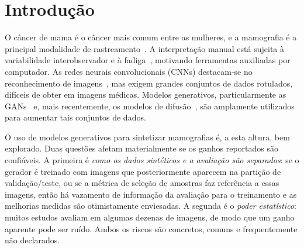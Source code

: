 \documentclass[runningheads]{llncs}
\begin{document}
\section{Introdução}
O câncer de mama é o câncer mais comum entre as mulheres, e a mamografia é a
principal modalidade de rastreamento~\cite{precoce2004controle,azevedo2016importancia}.
A interpretação manual está sujeita à variabilidade interobservador e à
fadiga~\cite{obuchowicz2020interobserver}, motivando ferramentas auxiliadas por
computador. As redes neurais convolucionais (CNNs) destacam-se no reconhecimento
de imagens~\cite{lecun2015deep,mendel2019transfer}, mas exigem grandes conjuntos
de dados rotulados, difíceis de obter em imagens médicas. Modelos generativos,
particularmente as GANs~\cite{goodfellow2014gan} e, mais recentemente, os modelos
de difusão~\cite{rombach2022ldm}, são amplamente utilizados para aumentar tais
conjuntos de dados.

O uso de modelos generativos para sintetizar mamografias é, a esta altura, bem
explorado. Duas questões afetam materialmente se os ganhos reportados são
confiáveis. A primeira é \emph{como os dados sintéticos e a avaliação são
separados}: se o gerador é treinado com imagens que posteriormente aparecem na
partição de validação/teste, ou se a métrica de seleção de amostras faz
referência a essas imagens, então há vazamento de informação da avaliação para o
treinamento e as melhorias medidas são otimistamente enviesadas. A segunda é o
\emph{poder estatístico}: muitos estudos avaliam em algumas dezenas de imagens,
de modo que um ganho aparente pode ser ruído. Ambos os riscos são concretos,
comuns e frequentemente não declarados.
\end{document}
